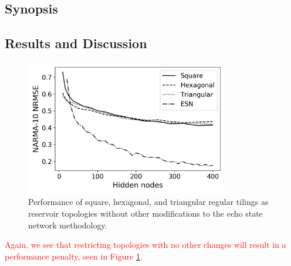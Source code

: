 \subsection{Synopsis}

\subsection{Results and Discussion}

\begin{figure}[t]
  \centering
  \includegraphics[width=3.5in]{figures/regular-tilings-performance.png}
  \caption{
    Performance of square, hexagonal, and triangular regular tilings as
reservoir topologies without other modifications to the echo state network
methodology.
  }
  \label{fig:rt-performance}
\end{figure}

\textcolor{red}{
  Again, we see that restricting topologies with no other changes will result in
a performance penalty, seen in Figure \ref{fig:rt-performance}.
}

